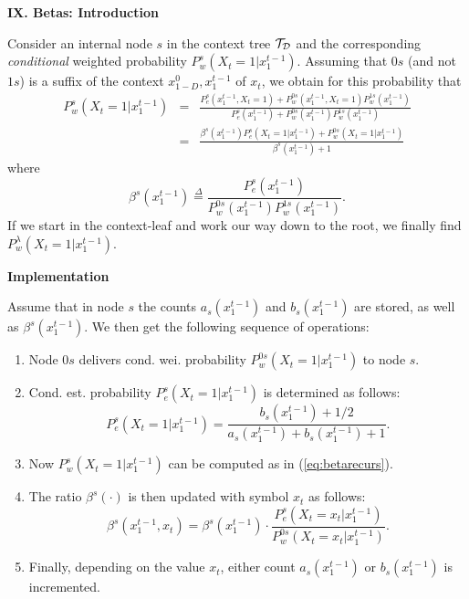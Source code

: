 \documentclass[a4paper,landscape]{slides} %
\newcommand{\define}{\stackrel{\Delta}{=}}
\newcommand{\xtm}{x_{1}^{t-1}}
\newcommand{\xpast}{x_{1-D}^{0}}
\newcommand{\cTD}{{\cal{T}_{D}}}
\begin{document}
\begin{slide}{\bf\Large\color{blue} IX. Betas: Introduction}

Consider an internal node $s$ in the context tree $\cTD$ and the corresponding {\em conditional} weighted probability $P_{w}^{s}(X_{t}=1|\xtm)$.
Assuming that $0s$ (and not $1s$) is a suffix of the context $\xpast,\xtm$ of $x_{t}$, we obtain for this probability that
\begin{eqnarray}
P_{w}^{s}(X_{t}=1|\xtm)
&=&\frac{ P_{e}^{s}(\xtm,X_{t}=1) + P_{w}^{0s}(\xtm,X_{t}=1) P_{w}^{1s}(\xtm) }
        { P_{e}^{s}(\xtm)         + P_{w}^{0s}(\xtm        ) P_{w}^{1s}(\xtm) }  \nonumber \\
&=&\frac{ \beta^{s}(\xtm) P_{e}^{s}(X_{t}=1|\xtm) + P_{w}^{0s}(X_{t}=1|\xtm) }
        { \beta^{s}(\xtm) + 1 } \label{eq:betarecurs}
\end{eqnarray}
where
\begin{equation}
\beta^{s}(\xtm) \define \frac{ P_{e}^{s}(\xtm) }{ P_{w}^{0s}(\xtm)P_{w}^{1s}(\xtm) }.\label{eq:betadef}
\end{equation}
If we start in the context-leaf and work our way down to the root, we finally find $P^{\lambda}_w(X_t=1|\xtm)$.
\end{slide}
\begin{slide}{\bf\large\color{red} Implementation}

Assume that in node $s$ the counts $a_{s}(\xtm)$ and $b_{s}(\xtm)$ are stored, as well as $\beta^{s}(\xtm)$.
We then get the following sequence of operations:
\begin{enumerate}
\item\vspace{-10mm}
Node $0s$ delivers cond. wei. probability $P_{w}^{0s}(X_{t}=1|\xtm)$ to node $s$.
\item\vspace{-10mm}
Cond. est. probability $P_e^s(X_t=1|\xtm)$ is determined as follows:
\begin{equation}
P_{e}^{s}(X_{t}=1|\xtm) = \frac{b_{s}(\xtm)+1/2}{a_{s}(\xtm)+b_{s}(\xtm)+1}.\label{eq:Pecon}
\end{equation}
\item\vspace{-10mm}
Now $P_w^s(X_t=1|\xtm)$ can be computed as in (\ref{eq:betarecurs}).
\item\vspace{-10mm}
The ratio $\beta^{s}(\cdot)$ is then updated with symbol $x_{t}$ as follows:
\begin{equation}
\beta^{s}(\xtm,x_{t}) = \beta^{s}(\xtm) \cdot \frac{ P_{e}^{s} (X_{t}=x_{t}|\xtm) }{ P_{w}^{0s}(X_{t}=x_{t}|\xtm) }.
\label{eq:betaupd}
\end{equation}
\item\vspace{-10mm}
Finally, depending on the value $x_t$, either count $a_{s}(\xtm)$ or $b_{s}(\xtm)$ is incremented.
\end{enumerate}
\end{slide}
\end{document}
